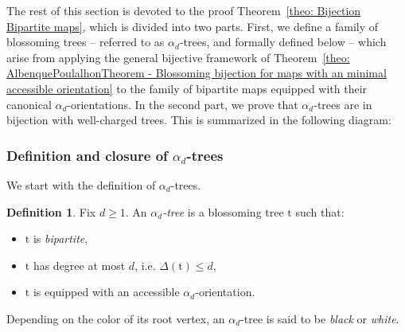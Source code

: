\documentclass[11pt,reqno,tbtags]{amsart}
\newcommand{\rt}{\mathrm{t}}
\numberwithin{equation}{section}
\numberwithin{theo}{section}
\theoremstyle{definition}
\newtheorem{defi}[theo]{Definition}
\begin{document}
The rest of this section is devoted to the proof Theorem~\ref{theo: Bijection Bipartite maps}, which is divided into two parts. First, we define a family of blossoming trees -- referred to as $\alpha_d$-trees, and formally defined below -- which arise from applying the general bijective framework of Theorem~\ref{theo: AlbenquePoulalhonTheorem - Blossoming bijection for maps with an minimal accessible orientation} to the family of bipartite maps equipped with their canonical $\alpha_d$-orientations. In the second part, we prove that $\alpha_d$-trees are in bijection with well-charged trees. This is summarized in the following diagram:\smallskip

\begin{center}
\end{center}


		\subsubsection{Definition and closure of $\alpha_d$-trees }\label{sub: alpha_d-trees}

We start with the definition of $\alpha_d$-trees.

\begin{defi}
Fix $d\geq 1$. An \emph{$\alpha_d$-tree} is a blossoming tree $\rt$ such that: 
\begin{itemize}
    \item $\rt$ is \emph{bipartite},
    \item $\rt$ has degree at most $d$, i.e. $\Delta(\rt)\leq d$,
    \item $\rt$ is equipped with an accessible $\alpha_d$-orientation.
\end{itemize}
Depending on the color of its root vertex, an $\alpha_d$-tree is said to be \emph{black} or \emph{white}.
\end{defi}
\end{document}
